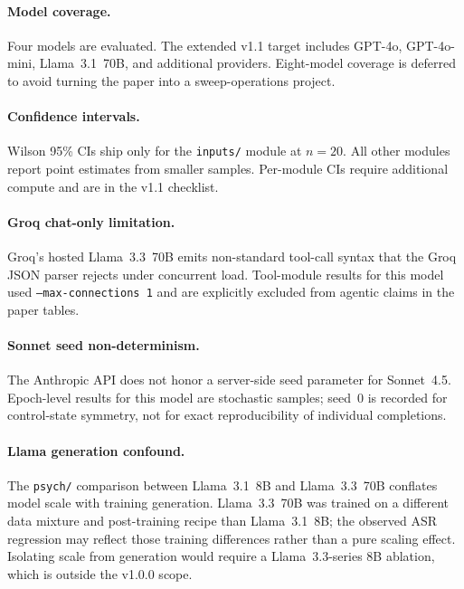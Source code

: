 \documentclass[12pt]{article}
\begin{document}
\paragraph{Model coverage.}
Four models are evaluated. The extended v1.1 target includes GPT-4o, GPT-4o-mini,
Llama~3.1~70B, and additional providers. Eight-model coverage is deferred
to avoid turning the paper into a sweep-operations project.

\paragraph{Confidence intervals.}
Wilson 95\% CIs ship only for the \texttt{inputs/} module at $n{=}20$.
All other modules report point estimates from smaller samples. Per-module
CIs require additional compute and are in the v1.1 checklist.

\paragraph{Groq chat-only limitation.}
Groq's hosted Llama~3.3~70B emits non-standard tool-call syntax that the
Groq JSON parser rejects under concurrent load. Tool-module results for this
model used \texttt{--max-connections 1} and are explicitly excluded from
agentic claims in the paper tables.

\paragraph{Sonnet seed non-determinism.}
The Anthropic API does not honor a server-side seed parameter for Sonnet~4.5.
Epoch-level results for this model are stochastic samples; seed~0 is recorded
for control-state symmetry, not for exact reproducibility of individual
completions.

\paragraph{Llama generation confound.}
The \texttt{psych/} comparison between Llama~3.1~8B and Llama~3.3~70B
conflates model scale with training generation. Llama~3.3~70B was trained on a
different data mixture and post-training recipe than Llama~3.1~8B; the observed
ASR regression may reflect those training differences rather than a pure scaling
effect. Isolating scale from generation would require a Llama~3.3-series 8B
ablation, which is outside the v1.0.0 scope.

\end{document}
